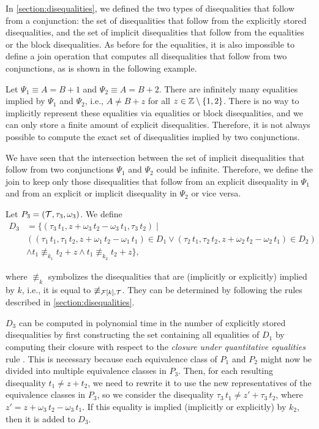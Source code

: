 In \cref{section:disequalities}, we defined the two types of disequalities that follow from a conjunction:
the set of disequalities that follow from the explicitly stored disequalities,
and the set of implicit disequalities that follow from the equalities or the block disequalities.
As before for the equalities, it is also impossible to define a join operation that computes all disequalities that follow from two conjunctions, as is shown in the following example.

\begin{example}
    Let $\Psi_1 \equiv A = B + 1$ and $\Psi_2 \equiv A = B + 2$. There are infinitely many equalities implied by $\Psi_1$ and $\Psi_2$, i.e., $A \neq B + z$ for all $z \in \mathbb{Z} \setminus \{1,2\}$.
    There is no way to implicitly represent these equalities via equalities or block disequalities, and we can only store a finite amount of explicit disequalities.
    Therefore, it is not always possible to compute the exact set of disequalities implied by two conjunctions.
\end{example}

We have seen that the intersection between the set of implicit disequalities that follow from two conjunctions $\Psi_1$ and $\Psi_2$ could be infinite.
Therefore, we define the join to keep only those disequalities that follow from an explicit disequality in $\Psi_1$ and from an explicit or implicit disequality in $\Psi_2$ or vice versa.

Let $P_3 = (\mathcal{T}, \tau_3, \omega_3)$.
We define
\[
\begin{array}{ll}
    D_3 & = \{(\tau_3\,t_1,  z + \omega_3\,t_2 - \omega_3\,t_1, \tau_3\,t_2) \mid                                                                            \\
        & ((\tau_1\,t_1, \tau_1\,t_2, z + \omega_1\,t_2 - \omega_1\,t_1) \in D_1 \lor (\tau_2\,t_1, \tau_2\,t_2, z + \omega_2\,t_2 - \omega_2\,t_1) \in D_2) \\
        & \land t_1 \nequiv_{k_1} t_2 + z \land t_1 \nequiv_{k_2} t_2 + z\},
\end{array}
\]

where $\nequiv_{k}$ symbolizes the disequalities that are (implicitly or explicitly) implied by $k$, i.e.,
it is equal to $\not\equiv_{\mathcal{F}[k],\mathcal{T}}$.
They can be determined by following the rules described in \cref{section:disequalities}.

$D_3$ can be computed in polynomial time in the number of explicitly stored disequalities by first constructing the set containing all equalities of $D_1$ by computing their closure with respect to the \emph{closure under quantitative equalities} rule .
This is necessary because each equivalence class of $P_1$ and $P_2$ might now be divided into multiple equivalence classes in $P_3$.
Then, for each resulting disequality $t_1 \neq z + t_2$,
we need to rewrite it to use the new representatives of the equivalence classes in $P_3$,
so we consider the disequality $\tau_3\,t_1 \neq z' + \tau_3\,t_2$,
where $z' = z + \omega_3\,t_2 - \omega_3\,t_1$.
If this equality is implied (implicitly or explicitly) by $k_2$, then it is added to $D_3$.

